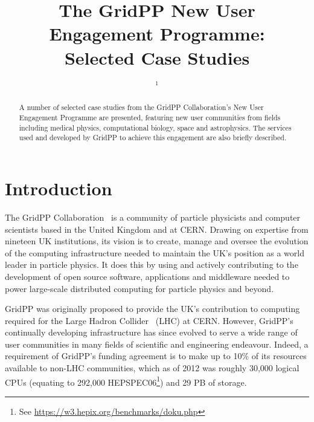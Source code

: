 \documentclass[12pt,a4paper]{iopart}
\begin{document}
%
%


\title{%
The GridPP New User Engagement Programme:\\
Selected Case Studies
}

% 
\author{\theauthorinit$^{1}$}
%
\address{$^1$\theauthoraddressA}
\ead{\mailto{\theauthoremail}}

\begin{abstract}
A number of selected case studies from the GridPP Collaboration's
New User Engagement Programme are presented,
featuring new user communities from fields including
medical physics, computational biology, space and astrophysics.
The services used and developed by GridPP
to achieve this engagement are also briefly
described.
\end{abstract}
%

\setcounter{tocdepth}{1}
\tableofcontents



\newpage

\section{Introduction}
\label{sec:intro}
The GridPP Collaboration~\cite{gridpp2006,gridpp2009}
is a community of particle physicists and computer
scientists based in the United Kingdom and at CERN.
Drawing on expertise from nineteen UK institutions,
its vision is to create, manage and oversee the evolution of the computing
infrastructure needed to maintain the UK's position as a world leader in
particle physics.
It does this by using and actively contributing to the development of
open source software, applications and middleware needed to power
large-scale distributed computing for particle physics and beyond.

GridPP was originally proposed to provide the UK's contribution to
computing required for the Large Hadron Collider~\cite{LHC2008} (LHC) at CERN.
%
However, GridPP's continually developing infrastructure has since
evolved to serve a wide range of user communities in many fields of
scientific and engineering endeavour.
Indeed, a requirement of GridPP's funding agreement is to make up
to 10\% of its resources available to non-LHC communities,
which as of 2012 was roughly 30,000 logical CPUs
(equating to 292,000 HEPSPEC06\footnote{%
See \href{https://w3.hepix.org/benchmarks/doku.php}{https://w3.hepix.org/benchmarks/doku.php}})
and 29 PB of storage.
\end{document}
